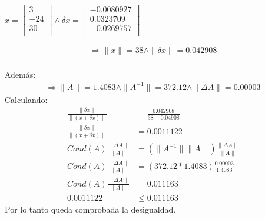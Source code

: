 \begin{center}
    $
    x=
    \begin{bmatrix}
       3 \\
       -24 \\
       30 \\
    \end{bmatrix} \wedge
    \delta x=
    \begin{bmatrix}
       -0.0080927 \\
       0.0323709 \\
       -0.0269757 \\
    \end{bmatrix}
    $
\end{center}
\begin{align}
    \Rightarrow \| x\| = 38 \wedge \| \delta x\| = 0.042908 
\end{align}
\\Además:
\begin{align}
    \Rightarrow \| A\| = 1.4083 \wedge \| A^{-1}\| = 372.12 \wedge \| \Delta A\| = 0.00003 
\end{align}
Calculando:
\begin{align}
    \frac{\| \delta x \|}{\|(x+\delta x) \|} &= \frac{0.042908}{38+0.04908} \nonumber \\
    \frac{\| \delta x \|}{\|(x+\delta x) \|} &= 0.0011122 \\
    Cond(A)\frac{\| \Delta A\|}{\| A\|} &= (\| A^{-1} \| \| A\|)\frac{\| \Delta A\|}{\| A\|} \nonumber \\
    Cond(A)\frac{\| \Delta A\|}{\| A\|} &= (372.12 * 1.4083)\frac{0.00003}{1.4083} \nonumber \\
    Cond(A)\frac{\| \Delta A\|}{\| A\|} &= 0.011163 \nonumber \\
    0.0011122 &\leq 0.011163
\end{align}
Por lo tanto queda comprobada la desigualdad.
\\